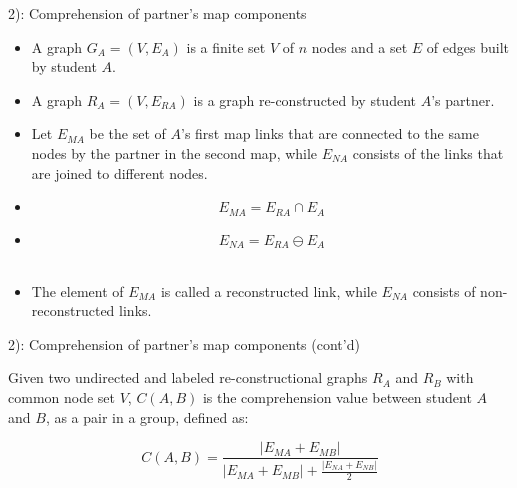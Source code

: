 \begin{frame}{2): Comprehension of partner's map components}

\begin{itemize}
    \item <+-> A graph $G_A = (V, E_A)$ is a finite set $V$ of $n$ nodes and a set $E$ of edges built by student $A$. 
    \item <+-> A graph $R_A = (V, E_{RA})$ is a graph re-constructed by student $A$'s partner. 
    \item <+-> Let $E_{MA}$ be the set of $A$'s first map links that are connected to the same nodes by the partner in the second map, while $E_{NA}$ consists of the links that are joined to different nodes.
    \item <+-> \begin{equation}
            E_{MA} = E_{RA} \cap E_A 
    \end{equation}
    \item <+-> \begin{equation}
            E_{NA} = E_{RA} \ominus E_A
    \end{equation}
    \\
    \item <+-> The element of $E_{MA}$ is called a reconstructed link, while $E_{NA}$ consists of non-reconstructed links.
\end{itemize}

\end{frame}

\begin{frame}{2): Comprehension of partner's map components (cont'd)}

Given two undirected and labeled re-constructional graphs $R_A$ and $R_B$ with common node set $V$, 
$C(A, B)$ is the comprehension value between student $A$ and $B$, as a pair in a group, defined as: 

\begin{equation}
  C(A, B) = \frac{|E_{MA} + E_{MB}|}{|E_{MA} + E_{MB}| + \frac{|E_{NA} + E_{NB}|}{2}} 
  \label{eq:6}
\end{equation}

\end{frame}

